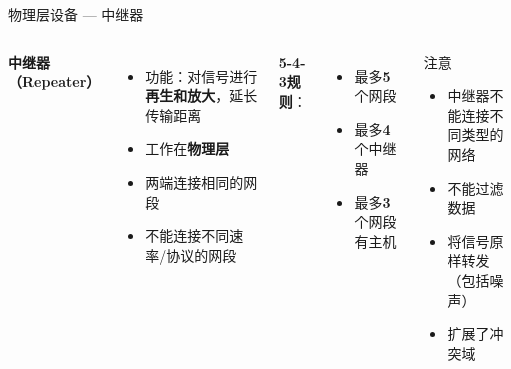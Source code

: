 \documentclass[10pt, aspectratio=169]{beamer}
\begin{document}
\begin{frame}{物理层设备 --- 中继器}
    \begin{columns}[T]
        \textbf{中继器（Repeater）}
        \begin{itemize}
            \item 功能：对信号进行\textbf{再生和放大}，延长传输距离
            \item 工作在\textbf{物理层}
            \item 两端连接相同的网段
            \item 不能连接不同速率/协议的网段
        \end{itemize}
        \vspace{0.3em}
        \textbf{5-4-3规则}：
        \begin{itemize}
            \item 最多\textbf{5}个网段
            \item 最多\textbf{4}个中继器
            \item 最多\textbf{3}个网段有主机
        \end{itemize}
        \begin{block}{注意}
            \begin{itemize}
                \item 中继器不能连接不同类型的网络
                \item 不能过滤数据
                \item 将信号原样转发（包括噪声）
                \item 扩展了冲突域
            \end{itemize}
        \end{block}
    \end{columns}
\end{frame}
\end{document}
